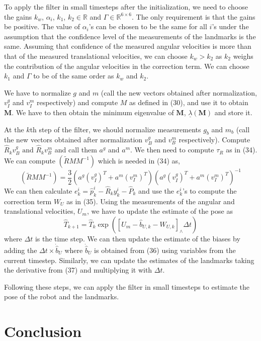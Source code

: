 \documentclass[12pt]{article}
\begin{document}
To apply the filter in small timesteps after the initialization, we need to choose 
the gains $k_w$, $\alpha_i$, $k_1$, $k_2 \in \mathbb{R}$ and $\Gamma \in \mathbb{R}^{6 \times 6}$.  The only requirement is that the gains be positive. The value of $\alpha_i$'s can be chosen to be the same for all $i$'s under the assumption that the confidence level of the measurements of the landmarks is the same. 
Assuming that confidence of the measured angular velocities is more than that of the measured translational velocities, we can choose $k_w > k_2$ as $k_2$ weighs the contribution of the angular velocities in the correction term. We can choose $k_1$ and $\Gamma$ to be of the same order as $k_w$ and $k_2$. 

We have to normalize $g$ and $m$ (call the new vectors obtained after normalization, $v^g_I$ and $v^m_I$ respectively) and compute $M$ as defined in (30), and use it to obtain $\mathbf{M}$. We have  
to then obtain the minimum eigenvalue of $\mathbf{M}$, $\underline{\lambda}(\mathbf{M})$ and store it.

At the $k$th step of the filter, we should normalize measurements $g_b$ and $m_b$ (call the new vectors obtained after normalization $v^g_B$ and $v^m_B$ respectively). Compute $\hat R_k v^g_B \text{ and } \hat R_k v^m_B$ and call them $a^g$ and $a^m$. We then need to compute $\tau_R$ as in (34).
We can compute $(\tilde RMM^{-1})$ which is needed in (34) as, 
\[(\tilde RMM^{-1}) = \frac{3}{2} (a^g (v^g_I)^T + a^m (v^m_I)^T)(a^g (v^g_I)^T + a^m (v^m_I)^T)^{-1} \]
We can then calculate $e^i_k = \hat p^i_k - \hat R_k y^i_k - \hat P_k $
and use the $e^i_k$'s to compute the correction term $W_U$ as in (35). 
Using the measurements of the angular and translational velocities, $U_m$, 
we have to update the estimate of the pose as \[\hat T_{k+1} = \hat T_k \exp([U_m - \hat b_{U,k} - W_{U,k}]_\wedge \Delta t)\]
where $\Delta t$ is the time step.
We can then update the estimate of the biases by adding the $\Delta t \times \dot{\hat b}_U$ 
where $\dot{\hat b}_U$ is obtained from (36) using variables from the current timestep.  
Similarly, we can update the estimates of the landmarks taking the derivative from (37) and 
multiplying it with $\Delta t$. 

Following these steps, we can apply the filter in small timesteps to estimate the pose of the robot and the landmarks.


\section{Conclusion }
\end{document}
